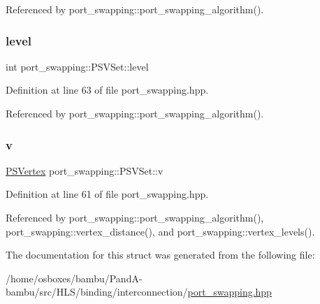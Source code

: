 Referenced by port\+\_\+swapping\+::port\+\_\+swapping\+\_\+algorithm().

\mbox{\label{structport__swapping_1_1PSVSet_aa51b0c8c4061d1669558f4411470a3ed}} 
\subsubsection{\texorpdfstring{level}{level}}
{\footnotesize\ttfamily int port\+\_\+swapping\+::\+P\+S\+V\+Set\+::level}



Definition at line 63 of file port\+\_\+swapping.\+hpp.



Referenced by port\+\_\+swapping\+::port\+\_\+swapping\+\_\+algorithm().

\mbox{\label{structport__swapping_1_1PSVSet_a4191401e9e071f32ddf8c58d7b154c77}} 
\subsubsection{\texorpdfstring{v}{v}}
{\footnotesize\ttfamily \hyperlink{classport__swapping_a9588366dd46f9f32aab2c8de93d5679f}{P\+S\+Vertex} port\+\_\+swapping\+::\+P\+S\+V\+Set\+::v}



Definition at line 61 of file port\+\_\+swapping.\+hpp.



Referenced by port\+\_\+swapping\+::port\+\_\+swapping\+\_\+algorithm(), port\+\_\+swapping\+::vertex\+\_\+distance(), and port\+\_\+swapping\+::vertex\+\_\+levels().



The documentation for this struct was generated from the following file\+:\begin{DoxyCompactItemize}
\item 
/home/osboxes/bambu/\+Pand\+A-\/bambu/src/\+H\+L\+S/binding/interconnection/\hyperlink{port__swapping_8hpp}{port\+\_\+swapping.\+hpp}\end{DoxyCompactItemize}
